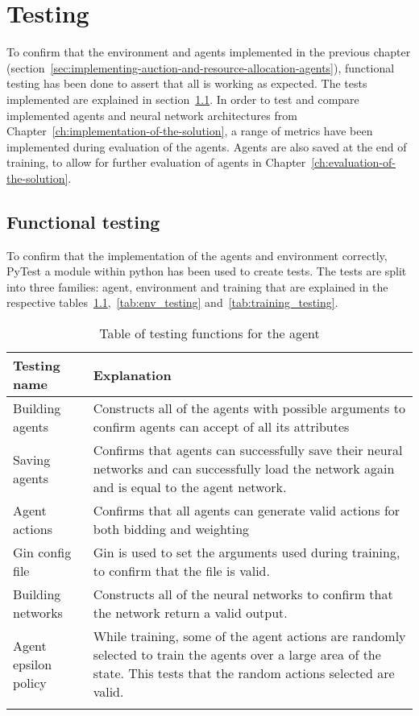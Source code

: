 \chapter{Testing}\label{ch:testing-of-the-implementation}
To confirm that the environment and agents implemented in the previous chapter
(section~\ref{sec:implementing-auction-and-resource-allocation-agents}), functional testing has been done to assert that
all is working as expected. The tests implemented are explained in section~\ref{sec:functional-testing}. In order to
test and compare implemented agents and neural network architectures from Chapter~\ref{ch:implementation-of-the-solution},
a range of metrics have been implemented during evaluation of the agents. Agents are also saved at the end of training,
to allow for further evaluation of agents in Chapter~\ref{ch:evaluation-of-the-solution}.

\section{Functional testing}\label{sec:functional-testing}
To confirm that the implementation of the agents and environment correctly, PyTest a module within python has been used
to create tests. The tests are split into three families: agent, environment and training that are explained
in the respective tables~\ref{tab:agent_testing},~\ref{tab:env_testing} and~\ref{tab:training_testing}.

\begin{longtable}{|p{3cm}|p{11cm}|} \hline
    \textbf{Testing name} & \textbf{Explanation} \\ \hline
    Building agents & Constructs all of the agents with possible arguments to confirm agents can accept of all its
        attributes\\ \hline
    Saving agents & Confirms that agents can successfully save their neural networks and can successfully load
        the network again and is equal to the agent network. \\ \hline
    Agent actions & Confirms that all agents can generate valid actions for both bidding and weighting \\ \hline
    Gin config file & Gin is used to set the arguments used during training, to confirm that the file is valid. \\ \hline
    Building networks & Constructs all of the neural networks to confirm that the network return a valid output. \\ \hline
    Agent epsilon policy & While training, some of the agent actions are randomly selected to train the agents over
        a large area of the state. This tests that the random actions selected are valid. \\ \hline
    \caption{Table of testing functions for the agent}
    \label{tab:agent_testing}
\end{longtable}

